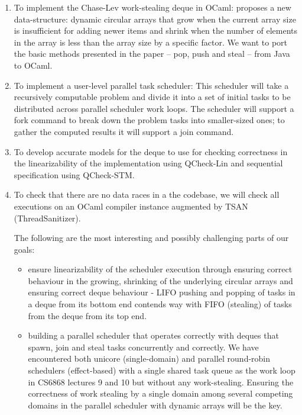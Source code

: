 \documentclass[11pt,a4paper]{article}
\begin{document}
\begin{enumerate}
    \item To implement the Chase-Lev work-stealing deque in OCaml: \cite{chase2005dynamic}
     proposes a new data-structure: dynamic circular arrays that grow when
     the current array size is insufficient for adding newer items and shrink
     when the number of elements in the array is less than the array size by a
     specific factor. We want to port the basic methods presented in the paper
     -- pop, push and steal -- from Java to OCaml.

   \item To implement a user-level parallel task scheduler: This
    scheduler will take a recursively computable problem and divide it into
    a set of initial tasks to be distributed across parallel scheduler work loops.
    The scheduler will support a fork command to break down the problem tasks
    into smaller-sized ones; to gather the computed results it will support
    a join command.

   \item To develop accurate models for the deque to use for checking correctness
       in the linearizability of the implementation using QCheck-Lin and
       sequential specification using QCheck-STM.

   \item To check that there are no data races in a the codebase, we will check
       all executions on an OCaml compiler instance augmented by TSAN
       (ThreadSanitizer).

    The following are the most interesting and possibly challenging parts of our
    goals:
    \begin{itemize}
        \item ensure linearizability of the scheduler execution through ensuring
            correct behaviour in the growing, shrinking of the underlying circular
            arrays and ensuring correct deque behaviour - LIFO
            pushing and popping of tasks in a deque from its bottom end contends
            way with FIFO (stealing) of tasks from the deque from its top end.
        \item building a parallel scheduler that operates correctly with
            deques that spawn, join and steal tasks concurrently and
            correctly. We have encountered both unicore (single-domain) and
            parallel round-robin schedulers (effect-based) with a single shared
            task queue as the work loop in CS6868 lectures 9 and 10 but without
            any work-stealing. Ensuring the correctness of work stealing by a
            single domain among several competing domains in the parallel
            scheduler with dynamic arrays will be the key.
    \end{itemize}


\end{enumerate}
\end{document}
